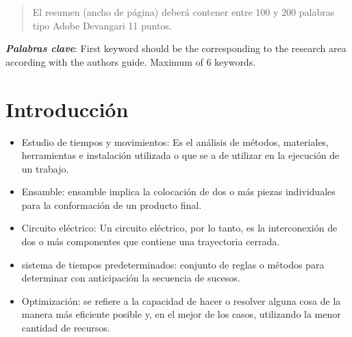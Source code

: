     \maketitle
    \thispagestyle{fancy}
    
    
    
    \begin{abstract}
    \noindent 
    El resumen (ancho de página) deberá contener entre 100 y 200 palabras tipo Adobe Devangari 11 puntos.
    
    \end{abstract}
    \textbf{\textit{Palabras clave}}: {First keyword should be the corresponding to the research area according with the authors guide. Maximum of 6 keywords.}
    
    \section{Introducción}
    
    \begin{itemize}
        \item Estudio de tiempos y movimientos: Es el análisis de métodos, materiales, herramientas e instalación utilizada o que se a de utilizar en la ejecución de un trabajo. 
        \item Ensamble: ensamble implica la colocación de dos o más piezas individuales para la conformación de un producto final. 
        \item Circuito eléctrico: Un circuito eléctrico, por lo tanto, es la interconexión de dos o más componentes que contiene una trayectoria cerrada.
        \item sistema de tiempos predeterminados: conjunto de reglas o métodos para determinar con anticipación la secuencia de sucesos.
        \item Optimización: se refiere a la capacidad de hacer o resolver alguna cosa de la manera más eficiente posible y, en el mejor de los casos, utilizando la menor cantidad de recursos.
    \end{itemize}
